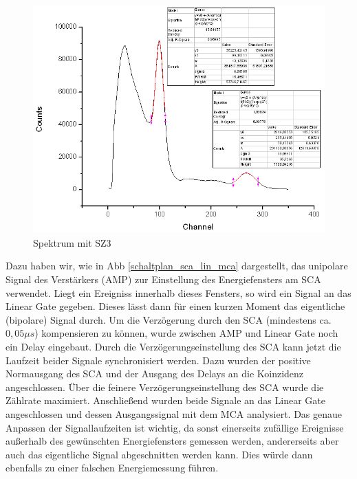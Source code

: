 \begin{figure}
 \includegraphics[width=\textwidth]{Graphen/SZ3.png}
 \caption{\Na Spektrum mit SZ3}
\end{figure}  

Dazu haben wir, wie in Abb \ref{schaltplan_sca_lin_mca} dargestellt, das unipolare Signal des Verstärkers (AMP) zur Einstellung des Energiefensters am SCA verwendet. Liegt ein Ereigniss innerhalb dieses Fensters, so wird ein Signal an das Linear Gate gegeben. Dieses lässt dann für einen kurzen Moment das eigentliche (bipolare) Signal durch. Um die Verzögerung durch den SCA (mindestens ca. $0,05\mu s$) kompensieren zu können, wurde zwischen AMP und Linear Gate noch ein Delay eingebaut. Durch die Verzögerungseinstellung des SCA kann jetzt die Laufzeit beider Signale synchronisiert werden. Dazu wurden der positive Normausgang des SCA und der Ausgang des Delays an die Koinzidenz angeschlossen. Über die feinere Verzögerungseinstellung des SCA wurde die Zählrate maximiert. Anschließend wurden beide Signale an das Linear Gate angeschlossen und dessen Ausgangssignal mit dem MCA analysiert. Das genaue Anpassen der Signallaufzeiten ist wichtig, da sonst einerseits zufällige Ereignisse außerhalb des gewünschten Energiefensters gemessen werden, andererseits aber auch das eigentliche Signal abgeschnitten werden kann. Dies würde dann ebenfalls zu einer falschen Energiemessung führen.

